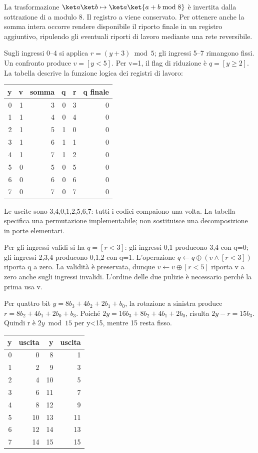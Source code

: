 
La trasformazione \(\ket a\ket b\mapsto\ket a\ket{a+b\bmod8}\) è invertita dalla sottrazione di a modulo 8. Il registro a viene conservato. Per ottenere anche la somma intera occorre rendere disponibile il riporto finale in un registro aggiuntivo, ripulendo gli eventuali riporti di lavoro mediante una rete reversibile.


Sugli ingressi 0–4 si applica \(r=(y+3)\bmod5\); gli ingressi 5–7 rimangono fissi. Un confronto produce \(v=[y<5]\). Per v=1, il flag di riduzione è \(q=[y\ge2]\). La tabella descrive la funzione logica dei registri di lavoro:\begin{center}\begin{tabular}{rrrrrr}\toprule y&v&somma&q&r&q finale\\\midrule
0&1&3&0&3&0\\
1&1&4&0&4&0\\
2&1&5&1&0&0\\
3&1&6&1&1&0\\
4&1&7&1&2&0\\
5&0&5&0&5&0\\
6&0&6&0&6&0\\
7&0&7&0&7&0\\
\bottomrule\end{tabular}\end{center}Le uscite sono 3,4,0,1,2,5,6,7: tutti i codici compaiono una volta. La tabella specifica una permutazione implementabile; non sostituisce una decomposizione in porte elementari.


Per gli ingressi validi si ha \(q=[r<3]\): gli ingressi 0,1 producono 3,4 con q=0; gli ingressi 2,3,4 producono 0,1,2 con q=1. L’operazione \(q\leftarrow q\oplus(v\land[r<3])\) riporta q a zero. La validità è preservata, dunque \(v\leftarrow v\oplus[r<5]\) riporta v a zero anche sugli ingressi invalidi. L’ordine delle due pulizie è necessario perché la prima usa v.


Per quattro bit \(y=8b_3+4b_2+2b_1+b_0\), la rotazione a sinistra produce \(r=8b_2+4b_1+2b_0+b_3\). Poiché \(2y=16b_3+8b_2+4b_1+2b_0\), risulta \(2y-r=15b_3\). Quindi r è \(2y\bmod15\) per y<15, mentre 15 resta fisso.\begin{center}\begin{tabular}{rrrr}\toprule y&uscita&y&uscita\\\midrule
0&0&8&1\\
1&2&9&3\\
2&4&10&5\\
3&6&11&7\\
4&8&12&9\\
5&10&13&11\\
6&12&14&13\\
7&14&15&15\\
\bottomrule\end{tabular}\end{center}

